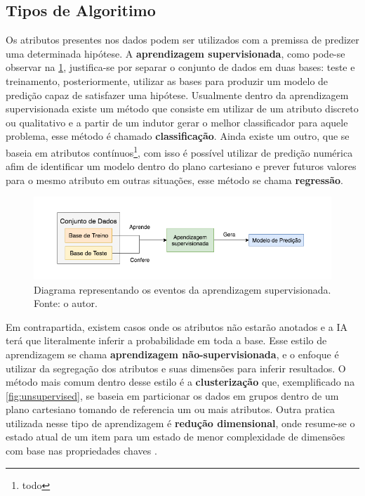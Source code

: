 \subsection{Tipos de Algoritimo}
Os atributos presentes nos dados podem ser utilizados com a premissa de predizer uma determinada hipótese. A \textbf{aprendizagem supervisionada}, como pode-se observar na \ref{fig:supervisedlearning}, justifica-se por separar o conjunto de dados em duas bases: teste e treinamento, posteriormente, utilizar as bases para produzir um modelo de predição capaz de satisfazer uma hipótese. Usualmente dentro da aprendizagem supervisionada existe um método que consiste em utilizar de um atributo discreto ou qualitativo e a partir de um indutor gerar o melhor classificador para aquele problema, esse método é chamado \textbf{classificação}. Ainda existe um outro, que se baseia em atributos contínuos\footnote{todo}, com isso é possível utilizar de predição numérica afim de identificar um modelo dentro do plano cartesiano e prever futuros valores para o mesmo atributo em outras situações, esse método se chama \textbf{regressão}. \cite{hastie2009unsupervised, russell2003artificial}

\begin{figure}[H]
    \centering
    \includegraphics[width=.8\textwidth]{imagens/supervisedlearning.png}
    \caption{Diagrama representando os eventos da aprendizagem supervisionada. Fonte: o autor.}
    \label{fig:supervisedlearning}
\end{figure}

Em contrapartida, existem casos onde os atributos não estarão anotados e a IA terá que literalmente inferir a probabilidade em toda a base. Esse estilo de aprendizagem se chama \textbf{aprendizagem não-supervisionada}, e o enfoque é utilizar da segregação dos atributos e suas dimensões para inferir resultados. O método mais comum dentro desse estilo é a \textbf{clusterização} que, exemplificado na \ref{fig:unsupervised}, se baseia em particionar os dados em grupos dentro de um plano cartesiano tomando de referencia um ou mais atributos. Outra pratica utilizada nesse tipo de aprendizagem é \textbf{redução dimensional}, onde resume-se o estado atual de um item para um estado de menor complexidade de dimensões com base nas propriedades chaves \cite{hastie2009unsupervised, mohri2012foundations}.

